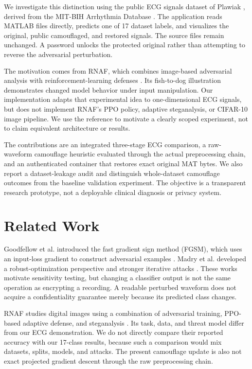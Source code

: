 \documentclass{jpp}
\begin{document}
We investigate this distinction using the public ECG signals dataset of Plawiak \cite{plawiak2017}, derived from the MIT-BIH Arrhythmia Database \cite{moody2001}. The application reads MATLAB files directly, predicts one of 17 dataset labels, and visualizes the original, public camouflaged, and restored signals. The source files remain unchanged. A password unlocks the protected original rather than attempting to reverse the adversarial perturbation.

The motivation comes from RNAF, which combines image-based adversarial analysis with reinforcement-learning defenses \cite{rizwan2025}. Its fish-to-dog illustration demonstrates changed model behavior under input manipulation. Our implementation adapts that experimental idea to one-dimensional ECG signals, but does not implement RNAF's PPO policy, adaptive steganalysis, or CIFAR-10 image pipeline. We use the reference to motivate a clearly scoped experiment, not to claim equivalent architecture or results.

The contributions are an integrated three-stage ECG comparison, a raw-waveform camouflage heuristic evaluated through the actual preprocessing chain, and an authenticated container that restores exact original MAT bytes. We also report a dataset-leakage audit and distinguish whole-dataset camouflage outcomes from the baseline validation experiment. The objective is a transparent research prototype, not a deployable clinical diagnosis or privacy system.

\section{Related Work}

Goodfellow et al. introduced the fast gradient sign method (FGSM), which uses an input-loss gradient to construct adversarial examples \cite{goodfellow2015}. Madry et al. developed a robust-optimization perspective and stronger iterative attacks \cite{madry2018}. These works motivate sensitivity testing, but changing a classifier output is not the same operation as encrypting a recording. A readable perturbed waveform does not acquire a confidentiality guarantee merely because its predicted class changes.

RNAF studies digital images using a combination of adversarial training, PPO-based adaptive defense, and steganalysis \cite{rizwan2025}. Its task, data, and threat model differ from our ECG demonstration. We do not directly compare their reported accuracy with our 17-class results, because such a comparison would mix datasets, splits, models, and attacks. The present camouflage update is also not exact projected gradient descent through the raw preprocessing chain.
\end{document}

